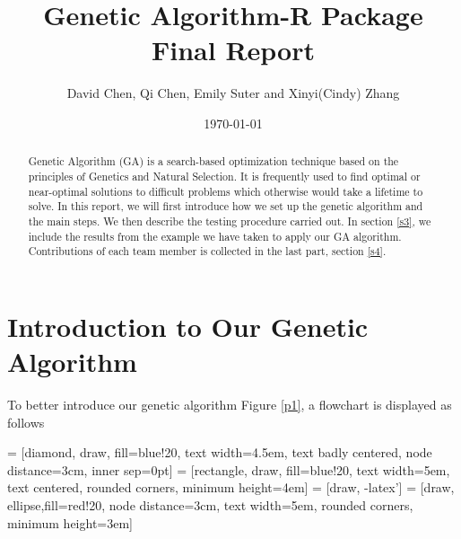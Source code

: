\documentclass{article}
\begin{document}


\title{\LARGE Genetic Algorithm-R Package Final Report}
\author{David Chen, Qi Chen, Emily Suter and Xinyi(Cindy) Zhang}

\date{\today}

\maketitle

\begin{abstract}
Genetic Algorithm (GA) is a search-based optimization technique based on the principles of Genetics and Natural Selection. It is frequently used to find optimal or near-optimal solutions to difficult problems which otherwise would take a lifetime to solve. In this report, we will first introduce how we set up the genetic algorithm and the main steps. We then describe the testing procedure carried out. In section \ref{s3}, we include the results from the example we have taken to apply our GA algorithm. Contributions of each team member is collected in the last part, section \ref{s4}.
\end{abstract}

\newpage
\pagestyle{empty}

\section{Introduction to Our Genetic Algorithm}\label{s1}
To better introduce our genetic algorithm  Figure \ref{p1}, a flowchart is displayed as follows

\vspace{5mm}

 = [diamond, draw, fill=blue!20,
    text width=4.5em, text badly centered, node distance=3cm, inner sep=0pt]
 = [rectangle, draw, fill=blue!20,
    text width=5em, text centered, rounded corners, minimum height=4em]
 = [draw, -latex']
 = [draw, ellipse,fill=red!20, node distance=3cm, text width=5em,
    rounded corners, minimum height=3em]
\end{document}
